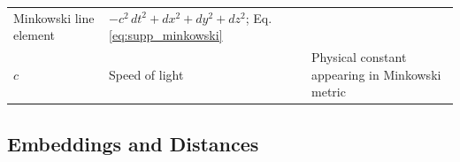 \documentclass[
  10pt,
]{article}
\begin{document}
\begin{longtable}[]{@{}lll@{}}
\begin{minipage}[t]{0.30\columnwidth}
Minkowski line element\strut
\end{minipage} & \begin{minipage}[t]{0.30\columnwidth}\raggedright
\(-c^2\,dt^2 + dx^2 + dy^2 + dz^2\); Eq. \eqref{eq:supp_minkowski}\strut
\end{minipage}\tabularnewline
\begin{minipage}[t]{0.30\columnwidth}\raggedright
\(c\)\strut
\end{minipage} & \begin{minipage}[t]{0.30\columnwidth}\raggedright
Speed of light\strut
\end{minipage} & \begin{minipage}[t]{0.30\columnwidth}\raggedright
Physical constant appearing in Minkowski metric\strut
\end{minipage}\tabularnewline
\bottomrule
\end{longtable}

\hypertarget{embeddings-and-distances}{%
\subsection{Embeddings and Distances}\label{embeddings-and-distances}}
\end{document}
